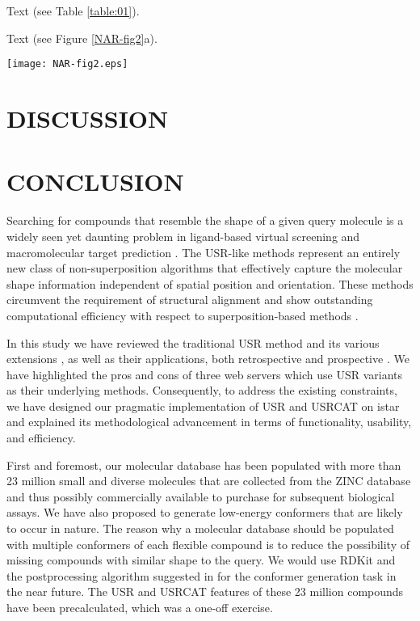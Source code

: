 \documentclass[a4,center,fleqn]{NAR}
\begin{document}
Text (see Table \ref{table:01}).

Text (see Figure \ref{NAR-fig2}a).

\begin{figure*}[t]
\begin{center}
\texttt{[image: NAR-fig2.eps]}
\end{center}
\caption{Caption for wide figure over two columns.
\textbf{(a)} Left figure.
\textbf{(b)} Right figure (see (a)).
}
\label{NAR-fig2}
\end{figure*}

\section{DISCUSSION}


\section{CONCLUSION}

Searching for compounds that resemble the shape of a given query molecule is a widely seen yet daunting problem in ligand-based virtual screening \cite{1332,1380,1281,1504,1502,1615} and macromolecular target prediction \cite{1407,1408,1402}. The USR-like methods \cite{1379,1338,1331} represent an entirely new class of non-superposition algorithms that effectively capture the molecular shape information independent of spatial position and orientation. These methods circumvent the requirement of structural alignment and show outstanding computational efficiency with respect to superposition-based methods \cite{1440,887,1439}.

In this study we have reviewed the traditional USR method \cite{1379} and its various extensions \cite{1333,1436,1437,1334,1335,1337,1338,1331,1407,1408}, as well as their applications, both retrospective \cite{1332,1331} and prospective \cite{1505,1380,1281,1504,1502,1615}. We have highlighted the pros and cons of three web servers \cite{1436,1437,1408} which use USR variants as their underlying methods. Consequently, to address the existing constraints, we have designed our pragmatic implementation of USR \cite{1379} and USRCAT \cite{1331} on istar \cite{1362} and explained its methodological advancement in terms of functionality, usability, and efficiency.

First and foremost, our molecular database has been populated with more than 23 million small and diverse molecules that are collected from the ZINC database \cite{532,1178} and thus possibly commercially available to purchase for subsequent biological assays. We have also proposed to generate low-energy conformers that are likely to occur in nature. The reason why a molecular database should be populated with multiple conformers of each flexible compound is to reduce the possibility of missing compounds with similar shape to the query. We would use RDKit and the postprocessing algorithm suggested in \cite{1127} for the conformer generation task in the near future. The USR and USRCAT features of these 23 million compounds have been precalculated, which was a one-off exercise.
\end{document}
